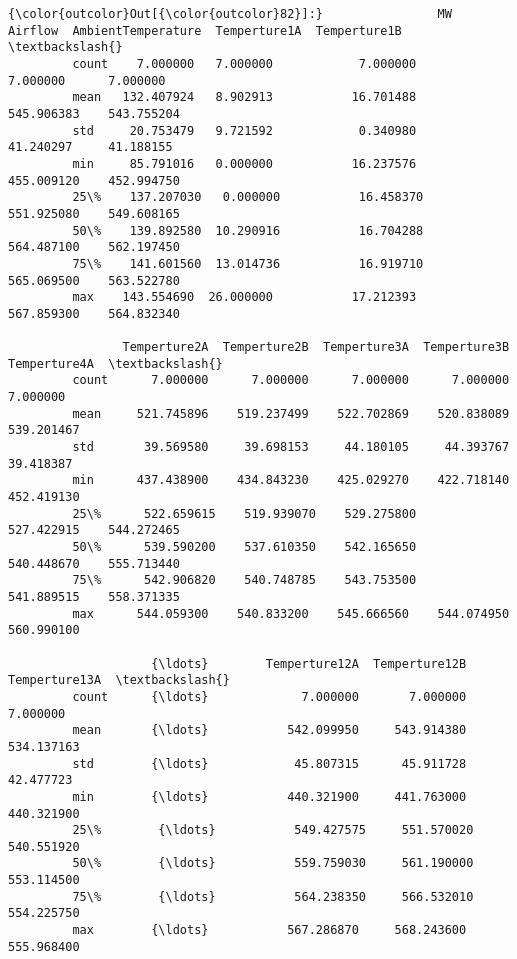\documentclass[11pt]{article}
\begin{document}
\begin{Verbatim}[commandchars=\\\{\}]
{\color{outcolor}Out[{\color{outcolor}82}]:}                MW    Airflow  AmbientTemperature  Temperture1A  Temperture1B  \textbackslash{}
         count    7.000000   7.000000            7.000000      7.000000      7.000000   
         mean   132.407924   8.902913           16.701488    545.906383    543.755204   
         std     20.753479   9.721592            0.340980     41.240297     41.188155   
         min     85.791016   0.000000           16.237576    455.009120    452.994750   
         25\%    137.207030   0.000000           16.458370    551.925080    549.608165   
         50\%    139.892580  10.290916           16.704288    564.487100    562.197450   
         75\%    141.601560  13.014736           16.919710    565.069500    563.522780   
         max    143.554690  26.000000           17.212393    567.859300    564.832340   
         
                Temperture2A  Temperture2B  Temperture3A  Temperture3B  Temperture4A  \textbackslash{}
         count      7.000000      7.000000      7.000000      7.000000      7.000000   
         mean     521.745896    519.237499    522.702869    520.838089    539.201467   
         std       39.569580     39.698153     44.180105     44.393767     39.418387   
         min      437.438900    434.843230    425.029270    422.718140    452.419130   
         25\%      522.659615    519.939070    529.275800    527.422915    544.272465   
         50\%      539.590200    537.610350    542.165650    540.448670    555.713440   
         75\%      542.906820    540.748785    543.753500    541.889515    558.371335   
         max      544.059300    540.833200    545.666560    544.074950    560.990100   
         
                    {\ldots}        Temperture12A  Temperture12B  Temperture13A  \textbackslash{}
         count      {\ldots}             7.000000       7.000000       7.000000   
         mean       {\ldots}           542.099950     543.914380     534.137163   
         std        {\ldots}            45.807315      45.911728      42.477723   
         min        {\ldots}           440.321900     441.763000     440.321900   
         25\%        {\ldots}           549.427575     551.570020     540.551920   
         50\%        {\ldots}           559.759030     561.190000     553.114500   
         75\%        {\ldots}           564.238350     566.532010     554.225750   
         max        {\ldots}           567.286870     568.243600     555.968400   
         

\end{Verbatim}
\end{document}

